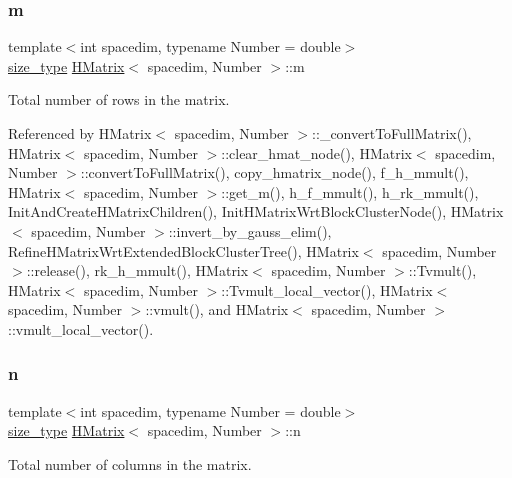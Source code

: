 \mbox{\label{classHMatrix_aa5523463043e4d542eae17d262bd22ad}} 
\subsubsection{\texorpdfstring{m}{m}}
{\footnotesize\ttfamily template$<$int spacedim, typename Number = double$>$ \\
\hyperlink{classHMatrix_a5ca8dc549783d38371a01ecd621ecb34}{size\+\_\+type} \hyperlink{classHMatrix}{H\+Matrix}$<$ spacedim, Number $>$\+::m\hspace{0.3cm}{\ttfamily [private]}}

Total number of rows in the matrix. 

Referenced by H\+Matrix$<$ spacedim, Number $>$\+::\+\_\+convert\+To\+Full\+Matrix(), H\+Matrix$<$ spacedim, Number $>$\+::clear\+\_\+hmat\+\_\+node(), H\+Matrix$<$ spacedim, Number $>$\+::convert\+To\+Full\+Matrix(), copy\+\_\+hmatrix\+\_\+node(), f\+\_\+h\+\_\+mmult(), H\+Matrix$<$ spacedim, Number $>$\+::get\+\_\+m(), h\+\_\+f\+\_\+mmult(), h\+\_\+rk\+\_\+mmult(), Init\+And\+Create\+H\+Matrix\+Children(), Init\+H\+Matrix\+Wrt\+Block\+Cluster\+Node(), H\+Matrix$<$ spacedim, Number $>$\+::invert\+\_\+by\+\_\+gauss\+\_\+elim(), Refine\+H\+Matrix\+Wrt\+Extended\+Block\+Cluster\+Tree(), H\+Matrix$<$ spacedim, Number $>$\+::release(), rk\+\_\+h\+\_\+mmult(), H\+Matrix$<$ spacedim, Number $>$\+::\+Tvmult(), H\+Matrix$<$ spacedim, Number $>$\+::\+Tvmult\+\_\+local\+\_\+vector(), H\+Matrix$<$ spacedim, Number $>$\+::vmult(), and H\+Matrix$<$ spacedim, Number $>$\+::vmult\+\_\+local\+\_\+vector().

\mbox{\label{classHMatrix_ab5ae2eb472f81f80653ed4411629c2d1}} 
\subsubsection{\texorpdfstring{n}{n}}
{\footnotesize\ttfamily template$<$int spacedim, typename Number = double$>$ \\
\hyperlink{classHMatrix_a5ca8dc549783d38371a01ecd621ecb34}{size\+\_\+type} \hyperlink{classHMatrix}{H\+Matrix}$<$ spacedim, Number $>$\+::n\hspace{0.3cm}{\ttfamily [private]}}

Total number of columns in the matrix. 

